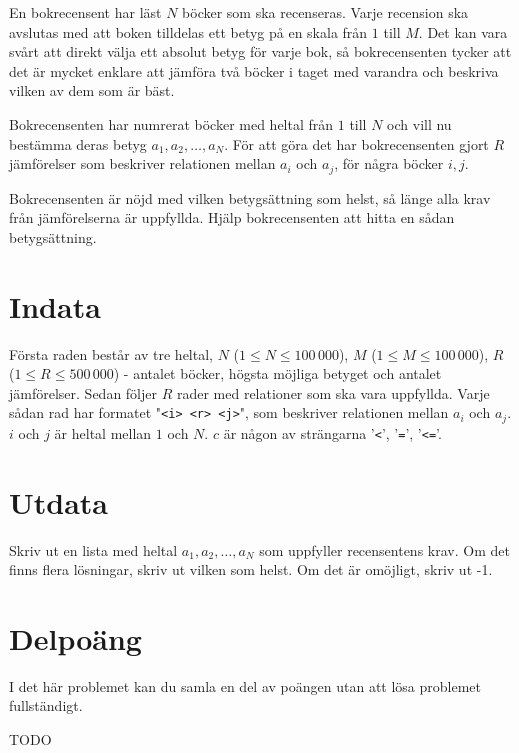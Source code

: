 
En bokrecensent har läst $N$ böcker som ska recenseras. Varje recension ska
avslutas med att boken tilldelas ett betyg på en skala från $1$ till $M$. Det kan
vara svårt att direkt välja ett absolut betyg för varje bok, så
bokrecensenten tycker att det är mycket enklare att jämföra två böcker i
taget med varandra och beskriva vilken av dem som är bäst.

Bokrecensenten har numrerat böcker med heltal från $1$ till $N$ och vill nu
bestämma deras betyg $a_1, a_2, \dots , a_N$. För att göra det har
bokrecensenten gjort $R$ jämförelser som beskriver relationen mellan $a_i$ och
$a_j$, för några böcker $i, j$.

Bokrecensenten är nöjd med vilken betygsättning som helst, så länge alla krav
från jämförelserna är uppfyllda. Hjälp bokrecensenten att hitta en sådan
betygsättning.

\section*{Indata}

Första raden består av tre heltal, $N$ ($1 \leq N \leq 100\,000$), 
$M$ ($1 \leq M \leq 100\,000$),
$R$ ($1 \leq R \leq 500\,000$) - antalet böcker, högsta möjliga
betyget och antalet jämförelser. Sedan följer $R$ rader med relationer som ska
vara
uppfyllda. Varje sådan rad har formatet "\texttt{<i> <r> <j>}",
som beskriver relationen mellan $a_i$ och $a_j$. $i$ och $j$ är heltal mellan
$1$ och $N$. $c$ är någon av strängarna '\texttt{<}', '\texttt{=}',
'\texttt{<=}'.

\section*{Utdata}

Skriv ut en lista med heltal $a_1, a_2, \ldots , a_N$ som uppfyller recensentens
krav. Om det finns flera lösningar, skriv ut vilken som helst. Om det är
omöjligt, skriv ut -1.

\section*{Delpoäng}

I det här problemet kan du samla en del av poängen utan att
lösa problemet fullständigt.

TODO
